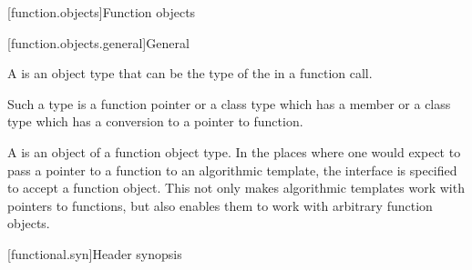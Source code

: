 [function.objects]{Function objects}

[function.objects.general]{General}

\pnum
A  is an object
type that can be the type of the
in a function call.
\begin{footnote}
Such a type is a function
pointer or a class type which has a member  or a class type
which has a conversion to a pointer to function.
\end{footnote}
A  is an
object of a function object type. In the places where one would expect to pass a
pointer to a function to an algorithmic template, the
interface is specified to accept a function object. This not only makes
algorithmic templates work with pointers to functions, but also enables them to
work with arbitrary function objects.

[functional.syn]{Header  synopsis}

